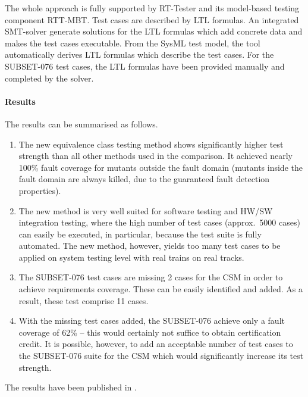 The whole approach is fully supported by RT-Tester and its model-based
testing component RTT-MBT. Test cases are described by LTL
formulas. An integrated SMT-solver generate solutions for the LTL
formulas which add  concrete data and makes the test cases
executable. From the SysML test
model, the tool automatically derives LTL
formulas which describe the test cases. For the SUBSET-076 test cases,
the LTL formulas have been provided manually and completed by the
solver. 

\paragraph{Results}
The results can be summarised as follows.
\begin{enumerate}
\item The new equivalence class testing method shows significantly
  higher test strength than all other methods used in the
  comparison. It achieved nearly 100\% fault coverage for mutants
  outside the fault domain (mutants inside the fault domain are always
  killed, due to the guaranteed fault detection properties).

\item The new method is very well suited for software testing and
  HW/SW integration testing, where the high number of test cases
  (approx.~5000 cases) can easily be executed, in particular, because
  the test suite is fully automated. The new method, however, yields
  too many test cases to be applied on system testing level with real
  trains on real tracks.


\item The SUBSET-076 test cases are missing 2 cases for the CSM in order to achieve
requirements coverage. These can be easily identified and added. As a result,
these test comprise 11 cases.

\item With the missing test cases added, the SUBSET-076 achieve only a fault coverage of
62\% -- this would certainly not suffice to obtain certification credit. It is
possible, however, to add an acceptable number of test cases to the SUBSET-076
suite for the CSM which would significantly increase its test strength.


\end{enumerate}


The results have been published in \cite{PeHu14,HHP14,BHHHPSV14,BHSHPSV14,BHHPS15}.

